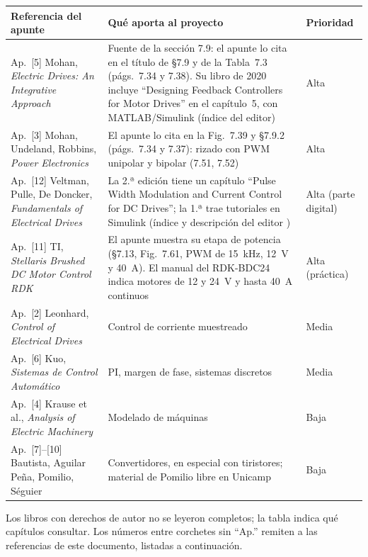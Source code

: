 \documentclass[11pt,a4paper]{article}
\begin{document}
\begin{center}
\begin{tabularx}{\linewidth}{>{\raggedright\arraybackslash}p{4.6cm}X>{\centering\arraybackslash}p{1.6cm}}
\toprule
Referencia del apunte & Qué aporta al proyecto & Prioridad \\
\midrule
Ap.~[5] Mohan, \emph{Electric Drives: An Integrative Approach} & Fuente de la sección 7.9: el apunte lo cita en el título de §7.9 y de la Tabla~7.3 (págs.~7.34 y 7.38). Su libro de 2020 \cite{mohan2020} incluye ``Designing Feedback Controllers for Motor Drives'' en el capítulo~5, con MATLAB/Simulink (índice del editor) & Alta \\
Ap.~[3] Mohan, Undeland, Robbins, \emph{Power Electronics} & El apunte lo cita en la Fig.~7.39 y §7.9.2 (págs.~7.34 y 7.37): rizado con PWM unipolar y bipolar (7.51, 7.52) & Alta \\
Ap.~[12] Veltman, Pulle, De Doncker, \emph{Fundamentals of Electrical Drives} & La 2.ª edición tiene un capítulo ``Pulse Width Modulation and Current Control for DC Drives''; la 1.ª trae tutoriales en Simulink (índice y descripción del editor \cite{veltman}) & Alta (parte digital) \\
Ap.~[11] TI, \emph{Stellaris Brushed DC Motor Control RDK} & El apunte muestra su etapa de potencia (§7.13, Fig.~7.61, PWM de 15~kHz, 12~V y 40~A). El manual del RDK-BDC24 indica motores de 12 y 24~V y hasta 40~A continuos \cite{rdk} & Alta (práctica) \\
Ap.~[2] Leonhard, \emph{Control of Electrical Drives} & Control de corriente muestreado & Media \\
Ap.~[6] Kuo, \emph{Sistemas de Control Automático} & PI, margen de fase, sistemas discretos & Media \\
Ap.~[4] Krause et al., \emph{Analysis of Electric Machinery} & Modelado de máquinas & Baja \\
Ap.~[7]--[10] Bautista, Aguilar Peña, Pomilio, Séguier & Convertidores, en especial con tiristores; material de Pomilio libre en Unicamp \cite{pomilio} & Baja \\
\bottomrule
\end{tabularx}
\end{center}
Los libros con derechos de autor no se leyeron completos; la tabla indica qué capítulos consultar. Los números entre corchetes sin ``Ap.'' remiten a las referencias de este documento, listadas a continuación.
\end{document}
